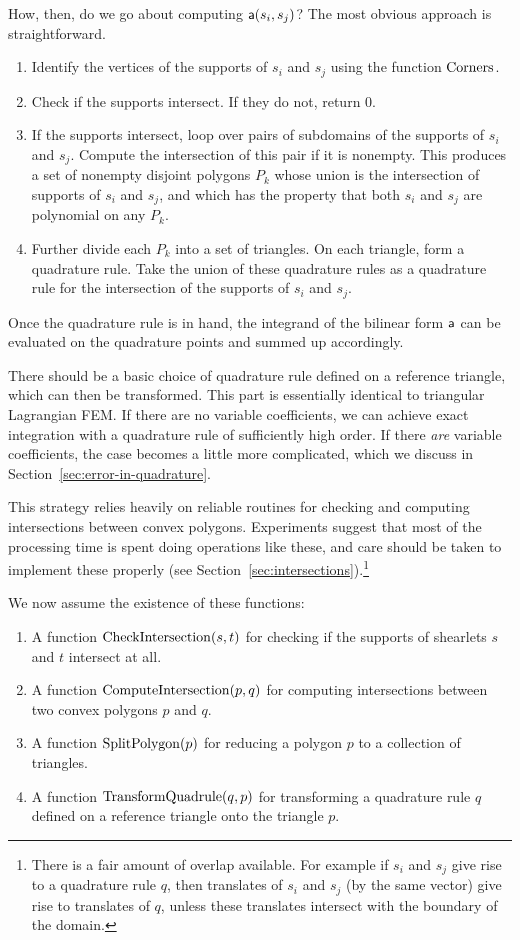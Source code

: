 How, then, do we go about computing ${\sf a}(s_i,s_j)$? The most obvious approach is straightforward.

\begin{enumerate}
\item Identify the vertices of the supports of $s_i$ and $s_j$ using the function $\operatorname{Corners}$.
\item Check if the supports intersect. If they do not, return $0$.
\item If the supports intersect, loop over pairs of subdomains of the supports of $s_i$ and $s_j$. Compute
the intersection of this pair if it is nonempty. This produces a set of nonempty disjoint polygons $P_k$
whose union is the intersection of supports of $s_i$ and $s_j$, and which has the property that both $s_i$ and
$s_j$ are polynomial on any $P_k$.
\item Further divide each $P_k$ into a set of triangles. On each triangle, form a quadrature rule. Take the
union of these quadrature rules as a quadrature rule for the intersection of the supports of $s_i$ and $s_j$.
\end{enumerate}

Once the quadrature rule is in hand, the integrand of the bilinear form ${\sf a}$ can be evaluated on the
quadrature points and summed up accordingly.

There should be a basic choice of quadrature rule defined on a reference triangle, which can then be
transformed.  This part is essentially identical to triangular Lagrangian FEM. If there are no variable
coefficients, we can achieve exact integration with a quadrature rule of sufficiently high order. If there
{\em are} variable coefficients, the case becomes a little more complicated, which we discuss in
Section~\ref{sec:error-in-quadrature}.

This strategy relies heavily on reliable routines for checking and computing intersections between convex
polygons. Experiments suggest that most of the processing time is spent doing operations like these, and care
should be taken to implement these properly (see Section~\ref{sec:intersections}).\footnote{There is a fair
amount of overlap available. For example if $s_i$ and $s_j$ give rise to a quadrature rule $q$, then
translates of $s_i$ and $s_j$ (by the same vector) give rise to translates of $q$, unless these translates
intersect with the boundary of the domain.}

We now assume the existence of these functions:

\begin{enumerate}
\item A function $\operatorname{CheckIntersection}(s,t)$ for checking if the supports of shearlets $s$ and $t$ intersect at
all.
\item A function $\operatorname{ComputeIntersection}(p,q)$ for computing intersections between two convex polygons $p$ and
$q$.
\item A function $\operatorname{SplitPolygon}(p)$ for reducing a polygon $p$ to a collection of triangles.
\item A function $\operatorname{TransformQuadrule}(q,p)$ for transforming a quadrature rule $q$ defined on a reference
triangle onto the triangle $p$.
\end{enumerate}

